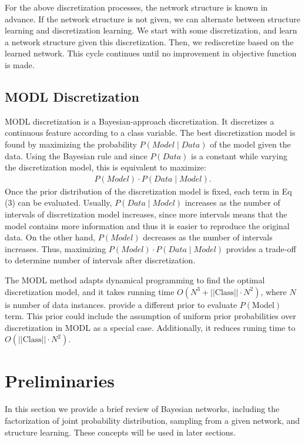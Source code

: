 For the above discretization processes, the network structure is known in advance. If the network structure is not given, we can alternate between structure learning and discretization learning. We start with some discretization, and learn a network structure given this discretization. Then, we rediscretize based on the learned network. This cycle continues until no improvement in objective function is made.
\subsection{MODL Discretization}
\label{MODL}
MODL discretization \cite{Boulle_2006} is a Bayesian-approach discretization. It discretizes a continuous feature according to a class variable. The best discretization model is found by maximizing the probability $P(\textit{Model} \mid \textit{Data})$ of the model given the data. Using the Bayesian rule and since $P(\textit{Data})$ is a constant while varying the discretization model, this is equivalent to maximize:
\begin{align}
P(\textit{Model}) \cdot P(\textit{Data} \mid \textit{Model}).
\end{align}
Once the prior distribution of the discretization model is fixed, each term in Eq (3) can be evaluated. Usually, $P(\textit{Data} \mid \textit{Model})$ increases as the number of intervals of discretization model increases, since more intervals means that the model contains more information and thus it is easier to reproduce the original data. On the other hand, $P(\textit{Model})$ decreases as the number of intervals increases. Thus, maximizing $P(\textit{Model}) \cdot P(\textit{Data} \mid \textit{Model})$ provides a trade-off to determine number of intervals after discretization. 

The MODL method adapts dynamical programming to find the optimal discretization model, and it takes running time $O(N^3 + ||\text{Class}|| \cdot N^2)$, where $N$ is number of data instances. \cite{Lustgarten_2011} provide a different prior to evaluate $P(\text{Model})$ term. This prior could include the assumption of uniform prior probabilities over discretization in MODL as a special case. Additionally, it reduces runing time to $O(||\text{Class}|| \cdot N^2)$.


\section{Preliminaries}
\label{Prelim_Notation}
In this section we provide a brief review of Bayesian networks, including the factorization of joint probability distribution, sampling from a given network, and structure learning. These concepts will be used in later sections.

